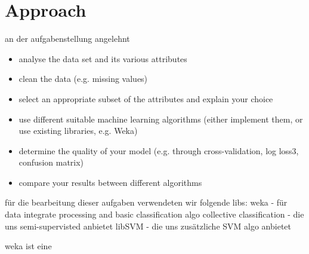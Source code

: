 \section{Approach}
\label{approach}


an der aufgabenstellung angelehnt

\begin{itemize}
	\item[\textbullet] analyse the data set and its various attributes
	\item[\textbullet] clean the data (e.g. missing values)
	\item[\textbullet] select an appropriate subset of the attributes and explain your choice
	\item[\textbullet] use different suitable machine learning algorithms (either implement them, or use existing libraries, e.g. Weka)
	\item[\textbullet] determine the quality of your model (e.g. through cross-validation, log loss3, confusion matrix)
	\item[\textbullet] compare your results between different algorithms
\end{itemize}

für die bearbeitung dieser aufgaben verwendeten wir folgende libs: 
weka - für data integrate processing and basic classification algo
collective classification - die uns semi-supervisted anbietet
libSVM - die uns zusätzliche SVM algo anbietet

weka ist eine 